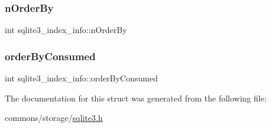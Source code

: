 \subsubsection{\texorpdfstring{nOrderBy}{nOrderBy}}
{\footnotesize\ttfamily int sqlite3\+\_\+index\+\_\+info\+::n\+Order\+By}

\mbox{\label{structsqlite3__index__info_a5515d9de0f37f68d7e0930c20a668b29}} 
\subsubsection{\texorpdfstring{orderByConsumed}{orderByConsumed}}
{\footnotesize\ttfamily int sqlite3\+\_\+index\+\_\+info\+::order\+By\+Consumed}



The documentation for this struct was generated from the following file\+:\begin{DoxyCompactItemize}
\item 
commons/storage/\mbox{\hyperlink{sqlite3_8h}{sqlite3.\+h}}\end{DoxyCompactItemize}
